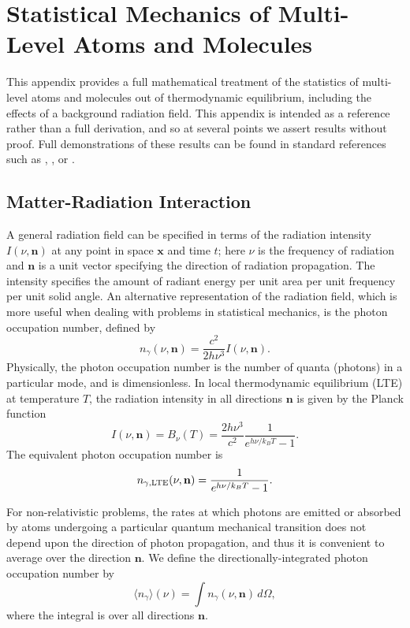 \chapter{Statistical Mechanics of Multi-Level Atoms and Molecules}
\label{app:multilevel_atoms}

This appendix provides a full mathematical treatment of the statistics of multi-level atoms and molecules out of thermodynamic equilibrium, including the effects of a background radiation field. This appendix is intended as a reference rather than a full derivation, and so at several points we assert results without proof. Full demonstrations of these results can be found in standard references such as \citet{rybicki86a}, \citet{shu91a}, or \citet{draine11a}.

\section{Matter-Radiation Interaction}

A general radiation field can be specified in terms of the radiation intensity $I(\nu, \mathbf{n})$ at any point in space $\mathbf{x}$ and time $t$; here $\nu$ is the frequency of radiation and $\mathbf{n}$ is a unit vector specifying the direction of radiation propagation. The intensity specifies the amount of radiant energy per unit area per unit frequency per unit solid angle. An alternative representation of the radiation field, which is more useful when dealing with problems in statistical mechanics, is the photon occupation number, defined by
\begin{equation}
n_\gamma(\nu, \mathbf{n}) = \frac{c^2}{2h\nu^3} I(\nu, \mathbf{n}).
\end{equation}
Physically, the photon occupation number is the number of quanta (photons) in a particular mode, and is dimensionless. In local thermodynamic equilibrium (LTE) at temperature $T$, the radiation intensity in all directions $\mathbf{n}$ is given by the Planck function
\begin{equation}
I(\nu,\mathbf{n}) = B_\nu(T) = \frac{2h\nu^3}{c^2}\frac{1}{e^{h\nu/k_B T} - 1}.
\end{equation}
The equivalent photon occupation number is
\begin{equation}
\label{eq:ngamma_LTE}
n_{\gamma,\rm LTE}(\nu,\mathbf{n}) = \frac{1}{e^{h\nu/k_B T} - 1}.
\end{equation}

For non-relativistic problems, the rates at which photons are emitted or absorbed by atoms undergoing a particular quantum mechanical transition does not depend upon the direction of photon propagation, and thus it is convenient to average over the direction $\mathbf{n}$. We define the directionally-integrated photon occupation number by
\begin{equation}
\langle n_\gamma\rangle(\nu) = \int n_\gamma(\nu, \mathbf{n}) \, d\Omega,
\end{equation}
where the integral is over all directions $\mathbf{n}$.

